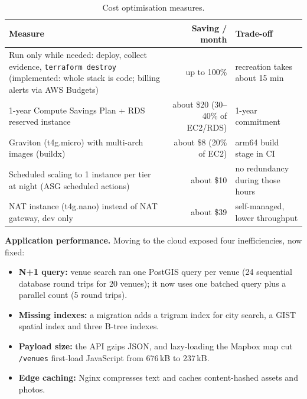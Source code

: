 \documentclass[10pt,a4paper]{article}
\begin{document}
\begin{table}[H]\centering\small
\caption{Cost optimisation measures.}\label{tab:costopt}
\begin{tabularx}{\linewidth}{@{}L r L@{}}
\toprule
Measure & Saving / month & Trade-off \\
\midrule
Run only while needed: deploy, collect evidence, \texttt{terraform destroy} (implemented: whole stack is code; billing alerts via AWS Budgets) & up to 100\% & recreation takes about 15 min \\
1-year Compute Savings Plan + RDS reserved instance & about \$20 (30--40\% of EC2/RDS) & 1-year commitment \\
Graviton (t4g.micro) with multi-arch images (buildx) & about \$8 (20\% of EC2) & arm64 build stage in CI \\
Scheduled scaling to 1 instance per tier at night (ASG scheduled actions) & about \$10 & no redundancy during those hours \\
NAT instance (t4g.nano) instead of NAT gateway, dev only & about \$39 & self-managed, lower throughput \\
\bottomrule
\end{tabularx}
\end{table}

\textbf{Application performance.} Moving to the cloud exposed four
inefficiencies, now fixed:
\begin{itemize}
  \item \textbf{N+1 query:} venue search ran one PostGIS query per venue (24
  sequential database round trips for 20 venues); it now uses one batched query
  plus a parallel count (5 round trips).
  \item \textbf{Missing indexes:} a migration adds a trigram index for city
  search, a GIST spatial index and three B-tree indexes.
  \item \textbf{Payload size:} the API gzips JSON, and lazy-loading the Mapbox
  map cut \texttt{/venues} first-load JavaScript from 676\,kB to 237\,kB.
  \item \textbf{Edge caching:} Nginx compresses text and caches content-hashed
  assets and photos.
\end{itemize}

\end{document}
